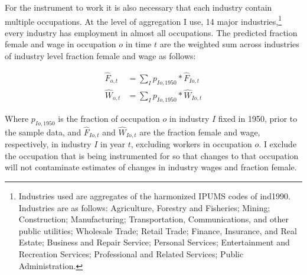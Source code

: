 \documentclass[12pt]{article}
\begin{document}
For the instrument to work it is also necessary that each industry contain multiple occupations. At the level of aggregation I use, 14 major industries,\footnote{Industries used are aggregates of the harmonized IPUMS codes of ind1990. Industries are as follows: Agriculture, Forestry and Fisheries; Mining; Construction; Manufacturing; Transportation, Communications, and other public utilities; Wholesale Trade; Retail Trade; Finance, Insurance, and Real Estate; Business and Repair Service; Personal Services; Entertainment and Recreation Services; Professional and Related Services; Public Administration.} every industry has employment in almost all occupations. The predicted fraction female and wage in occupation $o$ in time $t$ are the weighted sum across industries of industry level fraction female and wage as follows:

\begin{align*}
\hat{F}_{o,t} &= \sum_I  p_{Io,1950}*\hat{F}_{Io,t} \\
\hat{W}_{o,t} &= \sum_I  p_{Io,1950}*\hat{W}_{Io,t} 
\end{align*}

Where $p_{Io,1950}$ is the fraction of occupation $o$ in industry $I$ fixed in 1950, prior to the sample data, and $\hat{F}_{Io,t}$ and $\hat{W}_{Io,t}$ are the fraction female and wage, respectively, in industry $I$ in year $t$, excluding workers in occupation $o$. I exclude the occupation that is being instrumented for so that changes to that occupation will not contaminate estimates of changes in industry wages and fraction female. 




\end{document}
